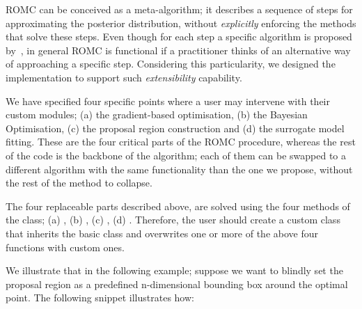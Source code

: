 ROMC can be conceived as a meta-algorithm; it describes a sequence of
steps for approximating the posterior distribution, without
\emph{explicitly} enforcing the methods that solve these steps. Even
though for each step a specific algorithm is proposed
by~\cite{Ikonomov2019}, in general ROMC is functional if a practitioner
thinks of an alternative way of approaching a specific
step. Considering this particularity, we designed the implementation
to support such \emph{extensibility} capability.

We have specified four specific points where a user may intervene with
their custom modules; (a) the gradient-based optimisation, (b) the
Bayesian Optimisation, (c) the proposal region construction and (d)
the surrogate model fitting. These are the four critical parts of the
ROMC procedure, whereas the rest of the code is the backbone of the
algorithm; each of them can be swapped to a different
algorithm with the same functionality than the one we propose, without the rest of the method to
collapse.

The four replaceable parts described above, are solved using the four
methods of the \linebreak {} class; (a)
, (b) ,
\linebreak (c) , (d)
. Therefore, the user should
create a custom class that inherits the basic
 class and overwrites one or more of the
above four functions with custom ones.

We illustrate that in the
following example; suppose we want to blindly set the proposal region
as a predefined n-dimensional bounding box around the optimal
point. The following snippet illustrates how:

